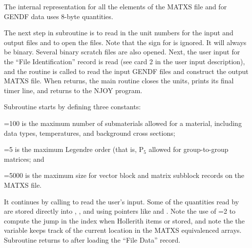 The internal representation for all the elements of the MATXS file
and for GENDF data uses 8-byte quantities.

The next step in subroutine 
is to read in the unit numbers for the input and output files and
to open the files.  Note that the sign for  is ignored.
 It will always be binary.  Several binary scratch files are also
opened.  Next, the user input for the ``File Identification'' record
is read (see card 2 in the user input description), and the
 routine is called to read
the input GENDF files and construct the output MATXS file.  When
 returns, the main routine closes the units, prints its
final timer line, and returns to the NJOY program.

Subroutine 
starts by defining three constants:

\begin{description}
\begin{singlespace}

\item[\cword{nsubmx}=100] is the maximum number of submaterials
   allowed for a material, including data types, temperatures, and
   background cross sections;
\item[\cword{maxord}=5] is the maximum Legendre order (that is,
   P$_5$ allowed for group-to-group matrices; and
\item[\cword{maxw}=5000] is the maximum size for vector block
   and matrix subblock records on the MATXS file.

\end{singlespace}
\end{description}

\noindent
It continues by calling 
to read the user's input.  Some of the quantities read by 
are stored directly into , , and  using
pointers like  and .  Note the use of
=2 to compute the jump in the index when Hollerith
items or stored, and note the the variable  keeps track
of the current location in the MATXS equivalenced arrays.  Subroutine
 returns to  after loading the ``File Data''
record.

